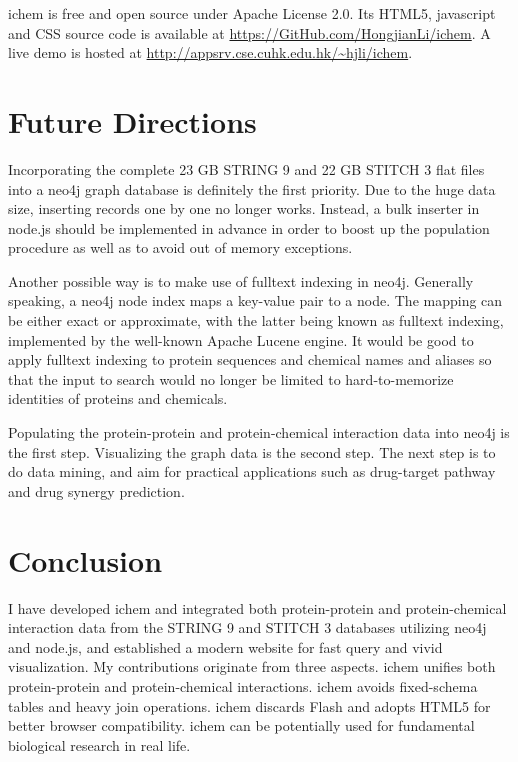 \documentclass[10pt,conference,compsocconf]{../IEEEtran}
\begin{document}
ichem is free and open source under Apache License 2.0. Its HTML5, javascript and CSS source code is available at \url{https://GitHub.com/HongjianLi/ichem}. A live demo is hosted at \url{http://appsrv.cse.cuhk.edu.hk/~hjli/ichem}.

\section{Future Directions}

Incorporating the complete 23 GB STRING 9 and 22 GB STITCH 3 flat files into a neo4j graph database is definitely the first priority. Due to the huge data size, inserting records one by one no longer works. Instead, a bulk inserter in node.js should be implemented in advance in order to boost up the population procedure as well as to avoid out of memory exceptions.

Another possible way is to make use of fulltext indexing in neo4j. Generally speaking, a neo4j node index maps a key-value pair to a node. The mapping can be either exact or approximate, with the latter being known as fulltext indexing, implemented by the well-known Apache Lucene engine. It would be good to apply fulltext indexing to protein sequences and chemical names and aliases so that the input to search would no longer be limited to hard-to-memorize identities of proteins and chemicals.

Populating the protein-protein and protein-chemical interaction data into neo4j is the first step. Visualizing the graph data is the second step. The next step is to do data mining, and aim for practical applications such as drug-target pathway and drug synergy prediction.

\section{Conclusion}

I have developed ichem and integrated both protein-protein and protein-chemical interaction data from the STRING 9 and STITCH 3 databases utilizing neo4j and node.js, and established a modern website for fast query and vivid visualization. My contributions originate from three aspects. ichem unifies both protein-protein and protein-chemical interactions. ichem avoids fixed-schema tables and heavy join operations. ichem discards Flash and adopts HTML5 for better browser compatibility. ichem can be potentially used for fundamental biological research in real life.



\end{document}
